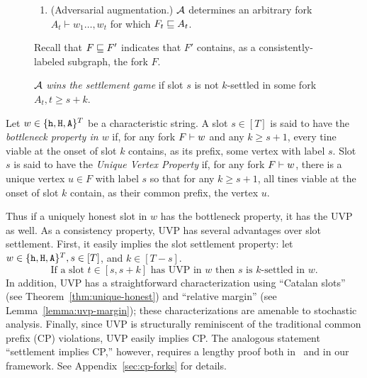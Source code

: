 \begin{figure*}[t]
\begin{center}
{\begin{minipage}{\textwidth}
\begin{enumerate}
\begin{enumerate}
            \item (Adversarial augmentation.) $\mathcal{A}$ determines an
              arbitrary fork $A_t \vdash w_1 \ldots, w_{t}$ for
              which $F_{t} \sqsubseteq A_{t}$.
            \end{enumerate}
             Recall that $F \sqsubseteq F'$ indicates that $F'$
              contains, as a consistently-labeled subgraph, the fork $F$.
          \end{enumerate}
          $\mathcal{A}$ \emph{wins the settlement game} if slot $s$ is not
          $k$-settled in some fork $A_t, t \geq s+k$.
        \end{minipage}
      }
    \end{center}
  \end{figure*}



  \begin{definition}\label{def:bottleneck-property}\label{def:unique-vertex-property}
    Let $w \in \{\mathtt{h}, \mathtt{H}, \mathtt{A}\}^T$ be a characteristic string.  
    A slot $s \in [T]$ is said to have the 
    \emph{bottleneck property in $w$} 
    if, 
    for any fork $F \vdash w$ 
    and any $k \geq s + 1$, 
    every tine viable at the onset of slot $k$ 
    contains, as its prefix, some vertex with label $s$.       
    Slot $s$ is said to have the \emph{Unique Vertex Property} 
    if, 
    for any fork $F \vdash w$, 
    there is a unique vertex $u \in F$ with label $s$ 
    so that 
    for any $k \geq s + 1$, 
    all tines viable at the onset of slot $k$ 
    contain, as their common prefix, 
    the vertex $u$.
  \end{definition}
  Thus 
  if a uniquely honest slot in $w$ has the bottleneck property, 
  it has the UVP as well.
  As a consistency property, UVP has several advantages over slot settlement. 
  First, it easily implies the slot settlement property:
  let $w \in \{\mathtt{h}, \mathtt{H}, \mathtt{A}\}^T, s \in [T]$, and $k \in [T - s]$. 
  \begin{equation}\label{eq:settlement-uvp}
    \text{If a slot $t \in [s, s + k]$ has UVP in $w$ 
    then $s$ is $k$-settled in $w$.}     
  \end{equation}  
  In addition, UVP has a straightforward characterization 
  using ``Catalan slots'' 
  (see Theorem~\ref{thm:unique-honest}) 
  and ``relative margin'' 
  (see Lemma~\ref{lemma:uvp-margin}); 
  these characterizations are amenable to stochastic analysis. 
  Finally, since UVP is structurally reminiscent of the traditional common prefix (CP) violations, 
  UVP easily implies CP. 
  The analogous statement ``settlement implies CP,'' however, 
  requires a lengthy proof both in~\cite{LinearConsistency} and in 
  our framework. See 
  Appendix~\ref{sec:cp-forks}
  for details.




